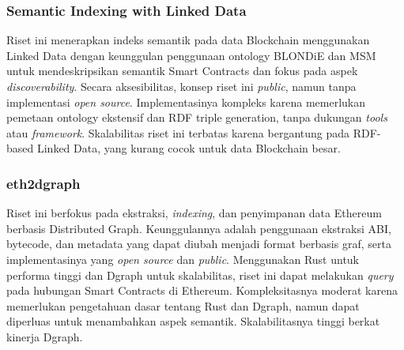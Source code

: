 



\subsubsection{Semantic Indexing with Linked Data \parencite{third2017linked}}

Riset ini menerapkan indeks semantik pada data Blockchain menggunakan Linked Data dengan keunggulan penggunaan ontology BLONDiE dan MSM untuk mendeskripsikan semantik Smart Contracts dan fokus pada aspek \textit{discoverability}. Secara aksesibilitas, konsep riset ini \textit{public}, namun tanpa implementasi \textit{open source}. Implementasinya kompleks karena memerlukan pemetaan ontology ekstensif dan RDF triple generation, tanpa dukungan \textit{tools} atau \textit{framework}. Skalabilitas riset ini terbatas karena bergantung pada RDF-based Linked Data, yang kurang cocok untuk data Blockchain besar.

\subsubsection{eth2dgraph \parencite{aimar2023extraction}}

Riset ini berfokus pada ekstraksi, \textit{indexing}, dan penyimpanan data Ethereum berbasis Distributed Graph. Keunggulannya adalah penggunaan ekstraksi ABI, bytecode, dan metadata yang dapat diubah menjadi format berbasis graf, serta implementasinya yang \textit{open source} dan \textit{public}. Menggunakan Rust untuk performa tinggi dan Dgraph untuk skalabilitas, riset ini dapat melakukan \textit{query} pada hubungan Smart Contracts di Ethereum. Kompleksitasnya moderat karena memerlukan pengetahuan dasar tentang Rust dan Dgraph, namun dapat diperluas untuk menambahkan aspek semantik. Skalabilitasnya tinggi berkat kinerja Dgraph.

